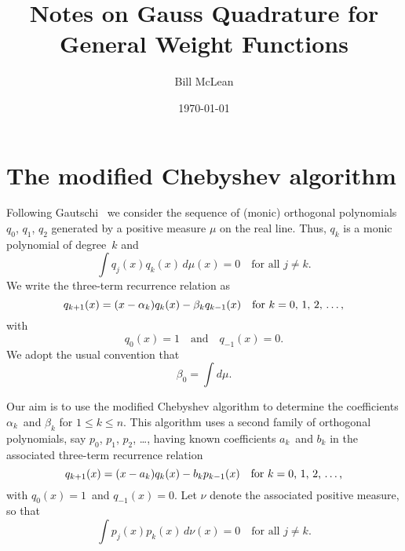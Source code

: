 \documentclass[12pt,a4paper]{article}
\title{Notes on Gauss Quadrature for General Weight Functions}
\author{Bill McLean}
\date{\today}
\begin{document}
\maketitle
\section{The modified Chebyshev algorithm}
Following Gautschi~\cite{Gautschi1982} we consider the sequence of 
(monic) orthogonal polynomials $q_0$, $q_1$, $q_2$ generated by a positive
measure $\mu$ on the real line.  Thus, $q_k$ is a monic polynomial of
degree~$k$ and
\[
\int q_j(x)q_k(x)\,d\mu(x)=0\quad\text{for all $j\ne k$.}
\]
We write the three-term recurrence relation as
\begin{equation}\label{eq: 3 term q}
q_{k+1}(x)=(x-\alpha_k)q_k(x)-\beta_k q_{k-1}(x)
	\quad\text{for $k=0$, $1$, $2$, \dots,}
\end{equation}
with
\[
q_0(x)=1\quad\text{and}\quad q_{-1}(x)=0.
\]
We adopt the usual convention that
\[
\beta_0=\int d\mu.
\]

Our aim is to use the modified Chebyshev algorithm to determine the 
coefficients $\alpha_k$~and $\beta_k$ for $1\le k\le n$.
This algorithm uses a second family of orthogonal polynomials, say
$p_0$, $p_1$, $p_2$, \dots, having known coefficients $a_k$~and $b_k$ 
in the associated three-term recurrence relation
\[
q_{k+1}(x)=(x-a_k)q_k(x)-b_kp_{k-1}(x)
	\quad\text{for $k=0$, $1$, $2$, \dots,}
\]
with $q_0(x)=1$~and $q_{-1}(x)=0$.  Let $\nu$ denote the associated 
positive measure, so that
\[
\int p_j(x)p_k(x)\,d\nu(x)=0\quad\text{for all $j\ne k$.}
\]
\end{document}
